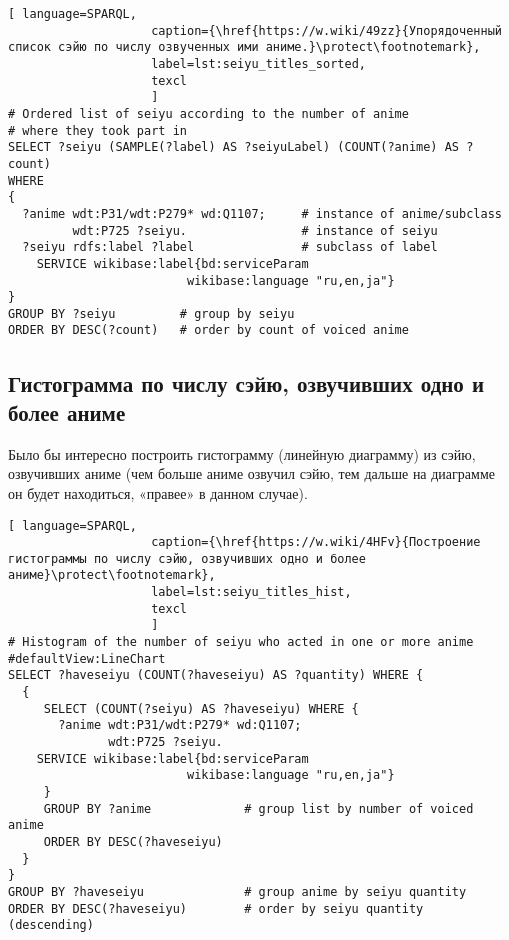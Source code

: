 \begin{lstlisting}[ language=SPARQL, 
                    caption={\href{https://w.wiki/49zz}{Упорядоченный список сэйю по числу озвученных ими аниме.}\protect\footnotemark},
                    label=lst:seiyu_titles_sorted,
                    texcl 
                    ]
# Ordered list of seiyu according to the number of anime
# where they took part in
SELECT ?seiyu (SAMPLE(?label) AS ?seiyuLabel) (COUNT(?anime) AS ?count)
WHERE
{
  ?anime wdt:P31/wdt:P279* wd:Q1107;	 # instance of anime/subclass
         wdt:P725 ?seiyu. 	             # instance of seiyu
  ?seiyu rdfs:label ?label	             # subclass of label
    SERVICE wikibase:label{bd:serviceParam
					     wikibase:language "ru,en,ja"}
}
GROUP BY ?seiyu		    # group by seiyu 
ORDER BY DESC(?count)	# order by count of voiced anime
\end{lstlisting}%

\subsection{Гистограмма по числу сэйю, озвучивших одно и более аниме}

Было бы интересно построить гистограмму (линейную диаграмму) из сэйю, озвучивших аниме (чем больше аниме озвучил сэйю, тем дальше на диаграмме он будет находиться, «правее» в данном случае).

\begin{lstlisting}[ language=SPARQL, 
                    caption={\href{https://w.wiki/4HFv}{Построение гистограммы по числу сэйю, озвучивших одно и более аниме}\protect\footnotemark},
                    label=lst:seiyu_titles_hist,
                    texcl 
                    ]
# Histogram of the number of seiyu who acted in one or more anime
#defaultView:LineChart
SELECT ?haveseiyu (COUNT(?haveseiyu) AS ?quantity) WHERE {
  {
     SELECT (COUNT(?seiyu) AS ?haveseiyu) WHERE {
       ?anime wdt:P31/wdt:P279* wd:Q1107;
              wdt:P725 ?seiyu.
    SERVICE wikibase:label{bd:serviceParam
					     wikibase:language "ru,en,ja"}
     }
     GROUP BY ?anime             # group list by number of voiced anime
     ORDER BY DESC(?haveseiyu) 
  }
}
GROUP BY ?haveseiyu              # group anime by seiyu quantity
ORDER BY DESC(?haveseiyu)        # order by seiyu quantity (descending)
\end{lstlisting}%

